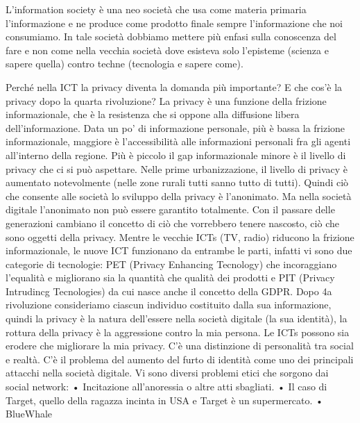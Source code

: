 \documentclass[11pt, a4page, twocolumn]{article}
\begin{document}
L’information society è una neo società che usa come materia primaria l’informazione e ne produce come prodotto finale sempre l’informazione che noi consumiamo. In tale società dobbiamo mettere più enfasi sulla conoscenza del fare e non come nella vecchia società dove esisteva solo l’episteme (scienza e sapere quella) contro techne (tecnologia e sapere come).

Perché nella ICT la privacy diventa la domanda più importante? E che cos’è la privacy dopo la quarta rivoluzione?
La privacy è una funzione della frizione informazionale, che è la resistenza che si oppone alla diffusione libera dell’informazione. Data un po’ di informazione personale, più è bassa la frizione informazionale, maggiore è l’accessibilità alle informazioni personali fra gli agenti all’interno della regione. Più è piccolo il gap informazionale minore è il livello di privacy che ci si può aspettare.
Nelle prime urbanizzazione, il livello di privacy è aumentato notevolmente (nelle zone rurali tutti sanno tutto di tutti). Quindi ciò che consente alle società lo sviluppo della privacy è l’anonimato. Ma nella società digitale l'anonimato non può essere garantito totalmente. Con il passare delle generazioni cambiano il concetto di ciò che vorrebbero tenere nascosto, ciò che sono oggetti della privacy. 
Mentre le vecchie ICTs (TV, radio) riducono la frizione informazionale, le nuove ICT funzionano da entrambe le parti, infatti vi sono due categorie di tecnologie: PET (Privacy Enhancing Tecnology) che incoraggiano l’equalità e migliorano sia la quantità che qualità dei prodotti e PIT (Privacy Intrudincg Tecnologies) da cui nasce anche il concetto della GDPR.
Dopo 4a rivoluzione consideriamo ciascun individuo costituito dalla sua informazione, quindi la privacy è la natura dell’essere nella società digitale (la sua identità), la rottura della privacy è la aggressione contro la mia persona. Le ICTs possono sia erodere che migliorare la mia privacy. C’è una distinzione di personalità tra social e realtà. C’è il problema del aumento del furto di identità come uno dei principali attacchi nella società digitale.
Vi sono diversi problemi etici che sorgono dai social network:
    • Incitazione all’anoressia o altre atti sbagliati.
    • Il caso di Target, quello della ragazza incinta in USA e Target è un supermercato.
    • BlueWhale
\end{document}
